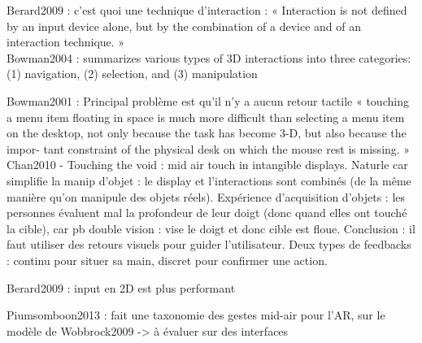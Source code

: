 
Berard2009 : c'est quoi une technique d'interaction : « Interaction is not defined by an input device alone, but by the combination of a device and of an interaction technique. »\\
Bowman2004 : summarizes various types of 3D interactions into three categories: (1) navigation, (2) selection, and (3)
manipulation

Bowman2001 : Principal problème est qu'il n'y a aucun retour tactile « touching a menu item floating in space is much more difficult than selecting a menu item on the desktop, not only because the task has become 3-D, but also because the impor- tant constraint of the physical desk on which the mouse rest is missing. »\\
Chan2010 - Touching the void : mid air touch in intangible displays. Naturle car simplifie la manip d'objet : le display et l'interactions sont combinés (de la même manière qu'on manipule des objets réels). Expérience d'acquisition d'objets : les personnes évaluent mal la profondeur de leur doigt (donc quand elles ont touché la cible), car pb double vision : vise le doigt et donc cible est floue. Conclusion : il faut utiliser des retours visuels pour guider l'utilisateur. Deux types de feedbacks : continu pour situer sa main, discret pour confirmer une action.

Berard2009 : input en 2D est plus performant

Piumsomboon2013 : fait une taxonomie des gestes mid-air pour l'AR, sur le modèle de Wobbrock2009 -> à évaluer sur des interfaces

